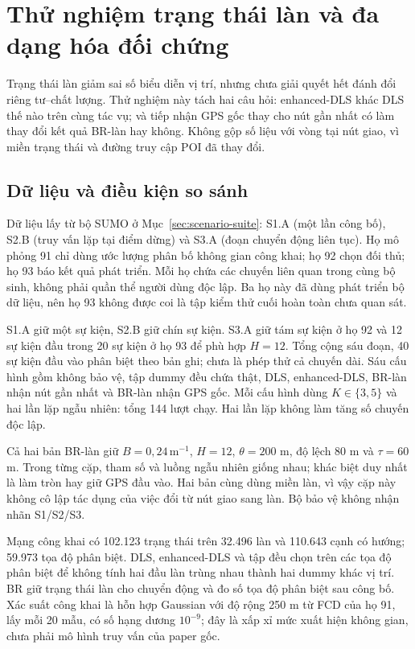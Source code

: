 \section{Thử nghiệm trạng thái làn và đa dạng hóa đối chứng}
\label{sec:lane-study}

Trạng thái làn giảm sai số biểu diễn vị trí, nhưng chưa giải quyết hết đánh đổi riêng tư--chất lượng. Thử nghiệm này tách hai câu hỏi: enhanced-DLS khác DLS thế nào trên cùng tác vụ; và tiếp nhận GPS gốc thay cho nút gần nhất có làm thay đổi kết quả BR-làn hay không. Không gộp số liệu với vòng tại nút giao, vì miền trạng thái và đường truy cập POI đã thay đổi.

\subsection{Dữ liệu và điều kiện so sánh}

Dữ liệu lấy từ bộ SUMO ở Mục~\ref{sec:scenario-suite}: S1.A (một lần công bố), S2.B (truy vấn lặp tại điểm dừng) và S3.A (đoạn chuyển động liên tục). Họ mô phỏng 91 chỉ dùng ước lượng phân bố không gian công khai; họ 92 chọn đối thủ; họ 93 báo kết quả phát triển. Mỗi họ chứa các chuyến liên quan trong cùng bộ sinh, không phải quần thể người dùng độc lập. Ba họ này đã dùng phát triển bộ dữ liệu, nên họ 93 không được coi là tập kiểm thử cuối hoàn toàn chưa quan sát.

S1.A giữ một sự kiện, S2.B giữ chín sự kiện. S3.A giữ tám sự kiện ở họ 92 và 12 sự kiện đầu trong 20 sự kiện ở họ 93 để phù hợp $H=12$. Tổng cộng sáu đoạn, 40 sự kiện đầu vào phân biệt theo bản ghi; chưa là phép thử cả chuyến dài. Sáu cấu hình gồm không bảo vệ, tập dummy đều chứa thật, DLS, enhanced-DLS, BR-làn nhận nút gần nhất và BR-làn nhận GPS gốc. Mỗi cấu hình dùng $K\in\{3,5\}$ và hai lần lặp ngẫu nhiên: tổng 144 lượt chạy. Hai lần lặp không làm tăng số chuyến độc lập.

Cả hai bản BR-làn giữ $B=0{,}24\,\mathrm{m}^{-1}$, $H=12$, $\theta=200$ m, độ lệch 80 m và $\tau=60$ m. Trong từng cặp, tham số và luồng ngẫu nhiên giống nhau; khác biệt duy nhất là làm tròn hay giữ GPS đầu vào. Hai bản cùng dùng miền làn, vì vậy cặp này không cô lập tác dụng của việc đổi từ nút giao sang làn. Bộ bảo vệ không nhận nhãn S1/S2/S3.

Mạng công khai có 102.123 trạng thái trên 32.496 làn và 110.643 cạnh có hướng; 59.973 tọa độ phân biệt. DLS, enhanced-DLS và tập đều chọn trên các tọa độ phân biệt để không tính hai đầu làn trùng nhau thành hai dummy khác vị trí. BR giữ trạng thái làn cho chuyển động và đo số tọa độ phân biệt sau công bố. Xác suất công khai là hỗn hợp Gaussian với độ rộng 250 m từ FCD của họ 91, lấy mỗi 20 mẫu, có số hạng dương $10^{-9}$; đây là xấp xỉ mức xuất hiện không gian, chưa phải mô hình truy vấn của paper gốc.

